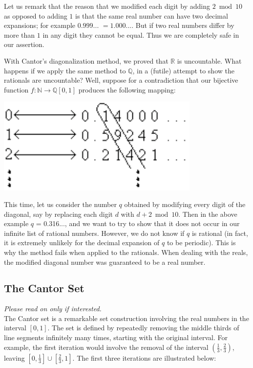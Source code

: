 \documentclass[11pt,fleqn]{article}
\begin{document}
Let us remark that the reason that we modified each digit by
adding $2 \bmod 10$ as opposed to adding $1$ is that the
same real number can have two decimal expansions; for example
$0.999$... $= 1.000$.... But if two real numbers differ by
more than $1$ in any digit they cannot be equal.  Thus we are
completely safe in our assertion.

With Cantor's diagonalization method, we proved that $\mathbb{R}$ is uncountable.
What happens if we apply the same method to $\mathbb{Q}$, in a (futile) attempt to show
the rationals are uncountable? Well, suppose for a contradiction that our bijective
function $f: \mathbb{N} \rightarrow \mathbb{Q} [0,1]$ produces the following mapping:

\includegraphics[bb = -40 0 0 90, scale = 0.7]{cantor3}

\noindent This time, let us consider the number $q$ obtained
by modifying every digit of the diagonal, say by replacing each digit $d$
with $d+2 \bmod 10$. Then in the above example $q$ = 0.316...,
and we want to try to show
that it does not occur in our infinite list of rational numbers. However, we
do not know if $q$ is rational (in fact, it is extremely unlikely for the
decimal expansion of $q$ to be periodic). This is why the method fails when applied
to the rationals. When dealing with the reals, the modified diagonal
number was guaranteed to be a real number.


\subsection*{The Cantor Set}
\textit{Please read on only if interested.}\\
The Cantor set is a remarkable set construction involving the real numbers in the interval
$[0,1]$. The set is defined by repeatedly removing the middle thirds of line segments infinitely many times,
starting with the original interval. For example, the first iteration would involve the removal of the interval $(\frac{1}{3},\frac{2}{3})$,
leaving $[0,\frac{1}{3}] \cup [\frac{2}{3},1]$. The first three iterations are illustrated below:
\end{document}
